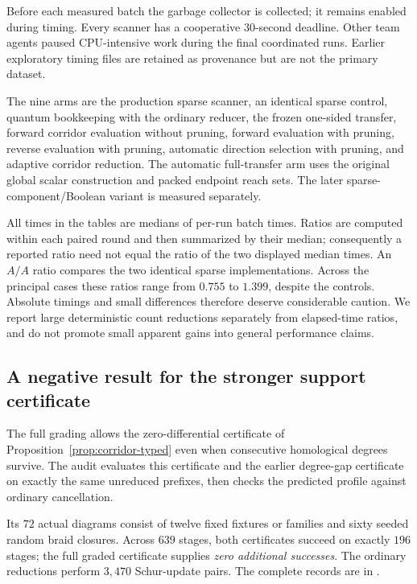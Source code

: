 Before each measured batch the garbage collector is collected; it
remains enabled during timing. Every scanner has a cooperative
\(30\)-second deadline. Other team agents paused CPU-intensive work
during the final coordinated runs. Earlier exploratory timing files
are retained as provenance but are not the primary dataset.

The nine arms are the production sparse scanner, an identical sparse
control, quantum bookkeeping with the ordinary reducer, the frozen
one-sided transfer, forward corridor evaluation without pruning,
forward evaluation with pruning, reverse evaluation with pruning,
automatic direction selection with pruning, and adaptive corridor
reduction. The automatic full-transfer arm uses the original global
scalar construction and packed endpoint reach sets. The later
sparse-component/Boolean variant is measured separately.

All times in the tables are medians of per-run batch times. Ratios
are computed within each paired round and then summarized by their
median; consequently a reported ratio need not equal the ratio of
the two displayed median times. An \(A/A\) ratio compares the two
identical sparse implementations. Across the principal cases these
ratios range from \(0.755\) to \(1.399\), despite the controls.
Absolute timings and small differences therefore deserve
considerable caution. We report large deterministic count
reductions separately from elapsed-time ratios, and do not promote
small apparent gains into general performance claims.

\subsection{A negative result for the stronger support certificate}

The full grading allows the zero-differential certificate of
Proposition~\ref{prop:corridor-typed} even when consecutive
homological degrees survive. The audit
 evaluates this certificate and
the earlier degree-gap certificate on exactly the same unreduced
prefixes, then checks the predicted profile against ordinary
cancellation.

Its \(72\) actual diagrams consist of twelve fixed fixtures or
families and sixty seeded random braid closures. Across \(639\)
stages, both certificates succeed on exactly \(196\) stages; the
full graded certificate supplies \emph{zero additional successes}.
The ordinary reductions perform \(3{,}470\) Schur-update pairs.
The complete records are in
.

